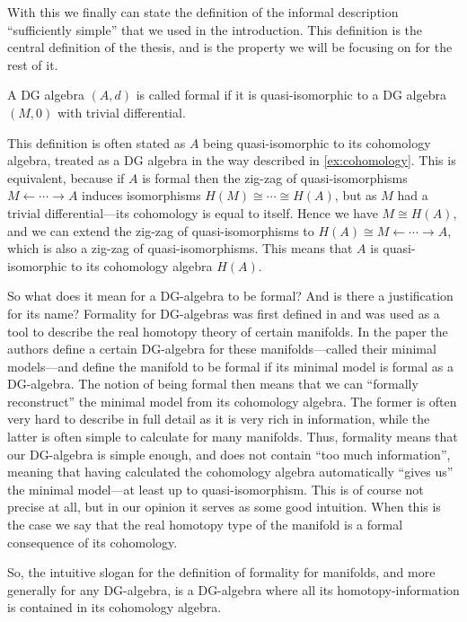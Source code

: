 With this we finally can state the definition of the informal description ``sufficiently simple'' that we used in the introduction. This definition is the central definition of the thesis, and is the property we will be focusing on for the rest of it. 

\begin{definition}
A DG algebra $(A, d)$ is called formal if it is quasi-isomorphic to a DG algebra $(M, 0)$ with trivial differential. 
\end{definition}

This definition is often stated as $A$ being quasi-isomorphic to its cohomology algebra, treated as a DG algebra in the way described in \ref{ex:cohomology}. This is equivalent, because if $A$ is formal then the zig-zag of quasi-isomorphisms $M \leftarrow \cdots \rightarrow A$ induces isomorphisms $H(M)\cong \cdots \cong H(A)$, but as $M$ had a trivial differential---its cohomology is equal to itself. Hence we have $M\cong H(A)$, and we can extend the zig-zag of quasi-isomorphisms to $H(A)\cong M \leftarrow \cdots \rightarrow A$, which is also a zig-zag of quasi-isomorphisms. This means that $A$ is quasi-isomorphic to its cohomology algebra $H(A)$. 

So what does it mean for a DG-algebra to be formal? And is there a justification for its name? Formality for DG-algebras was first defined in \cite{DGMS} and was used as a tool to describe the real homotopy theory of certain manifolds. In the paper the authors define a certain DG-algebra for these manifolds---called their minimal models---and define the manifold to be formal if its minimal model is formal as a DG-algebra. The notion of being formal then means that we can ``formally reconstruct'' the minimal model from its cohomology algebra. The former is often very hard to describe in full detail as it is very rich in information, while the latter is often simple to calculate for many manifolds. Thus, formality means that our DG-algebra is simple enough, and does not contain ``too much information'', meaning that having calculated the cohomology algebra automatically ``gives us'' the minimal model---at least up to quasi-isomorphism. This is of course not precise at all, but in our opinion it serves as some good intuition. When this is the case we say that the real homotopy type of the manifold is a formal consequence of its cohomology. 

So, the intuitive slogan for the definition of formality for manifolds, and more generally for any DG-algebra, is a DG-algebra where all its homotopy-information is contained in its cohomology algebra.

